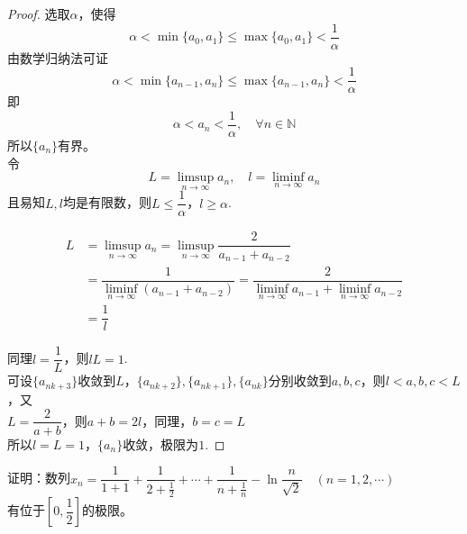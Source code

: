 \begin{proof}

    选取$\alpha$，使得
    $$\alpha < \min\{a_0,a_1\} \leq \max\{a_0,a_1\} < \dfrac{1}{\alpha}$$
    由数学归纳法可证
    $$\alpha < \min\{a_{n - 1},a_n\} \leq \max\{a_{n - 1},a_n\} < \dfrac{1}{\alpha}$$
    即
    $$\alpha < a_n < \dfrac{1}{\alpha}, \quad \forall n \in \mathbb{N}$$
    所以$\{a_n\}$有界。\\
    令
    $$L = \limsup_{n \to \infty}{a_n},\quad l = \liminf_{n \to \infty}{a_n}$$
    且易知$L,l$均是有限数，则$L \leq \dfrac{1}{\alpha}$，$l \geq \alpha$.

    \begin{align*}
        L & = \limsup_{n \to \infty}{a_n} = \limsup_{n \to \infty}{\dfrac{2}{a_{n - 1} + a_{n - 2}}} \\
         & = \dfrac{1}{\liminf\limits_{n \to \infty}{(a_{n - 1} + a_{n - 2})}} = \dfrac{2}{\liminf\limits_{n \to \infty}{a_{n - 1}} + \liminf\limits_{n \to \infty}{a_{n - 2}}} \\ 
         & = \dfrac{1}{l}
    \end{align*}

    同理$l = \dfrac{1}{L}$，则$lL = 1$. \\
    可设$\{a_{nk + 3}\}$收敛到$L$，$\{a_{nk + 2}\},\{a_{nk + 1}\},\{a_{nk}\}$分别收敛到$a,b,c$，则$l < a,b,c < L$，又 \\
    $L = \dfrac{2}{a + b} $，则$a + b = 2l $，同理，$b = c = L$ \\
    所以$l = L = 1$，$\{a_n\}$收敛，极限为$1$.

\end{proof}

\begin{proposition}

    证明：数列$x_n = \dfrac{1}{1 + 1} + \dfrac{1}{2 + \frac{1}{2}} + \cdots + \dfrac{1}{n + \frac{1}{n}} - \ln{\dfrac{n}{\sqrt{2}}} \quad (n = 1, 2, \cdots)$ \\
    有位于$\left[ 0,\dfrac{1}{2} \right]$的极限。
    
\end{proposition}

